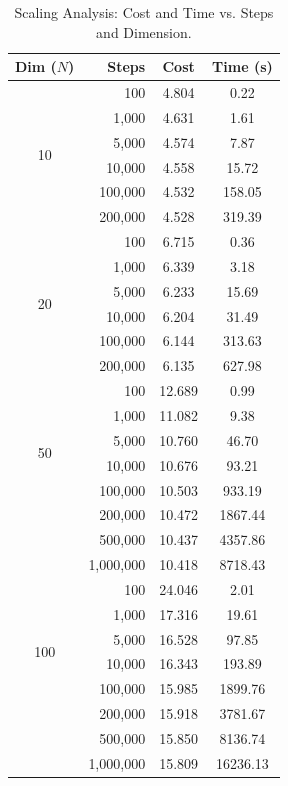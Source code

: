 \documentclass[letterpaper]{article} %
\begin{document}
\begin{table}[t]
\centering
\small
\caption{Scaling Analysis: Cost and Time vs. Steps and Dimension.}
\label{tab:scaling_results}
\begin{tabular}{c r c c}
\toprule
\textbf{Dim ($N$)} & \textbf{Steps} & \textbf{Cost} & \textbf{Time (s)} \\
\midrule
\multirow{6}{*}{10} 
  & 100     & 4.804 & 0.22 \\
  & 1,000   & 4.631 & 1.61 \\
  & 5,000   & 4.574 & 7.87 \\
  & 10,000  & 4.558 & 15.72 \\
  & 100,000 & 4.532 & 158.05 \\
  & 200,000 & 4.528 & 319.39 \\
\midrule
\multirow{6}{*}{20}
  & 100     & 6.715 & 0.36 \\
  & 1,000   & 6.339 & 3.18 \\
  & 5,000   & 6.233 & 15.69 \\
  & 10,000  & 6.204 & 31.49 \\
  & 100,000 & 6.144 & 313.63 \\
  & 200,000 & 6.135 & 627.98 \\
\midrule
\multirow{6}{*}{50} 
  & 100     & 12.689 & 0.99 \\
  & 1,000   & 11.082 & 9.38 \\
  & 5,000   & 10.760 & 46.70 \\
  & 10,000  & 10.676 & 93.21 \\
  & 100,000 & 10.503 & 933.19 \\
  & 200,000 & 10.472 & 1867.44 \\
  & 500,000 & 10.437 & 4357.86 \\
  & 1,000,000 & 10.418 & 8718.43 \\
\midrule
\multirow{6}{*}{100} 
  & 100     & 24.046 & 2.01 \\
  & 1,000   & 17.316 & 19.61 \\
  & 5,000   & 16.528 & 97.85 \\
  & 10,000  & 16.343 & 193.89 \\
  & 100,000 & 15.985 & 1899.76 \\
  & 200,000 & 15.918 & 3781.67 \\
  & 500,000 & 15.850 & 8136.74 \\
  & 1,000,000 & 15.809 & 16236.13 \\
\bottomrule
\end{tabular}
\end{table}
\end{document}
